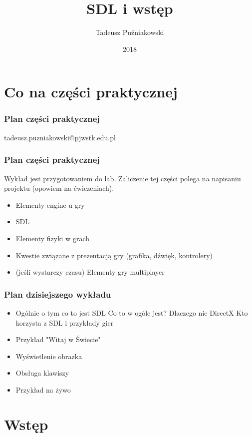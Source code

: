 \documentclass{beamer}
\title[SGD 1]{SDL i wstęp}
\author{Tadeusz Puźniakowski}
\institute{PJATK}
\date{2018}
\begin{document}


\frame{\titlepage}

\section{Co na części praktycznej}

\begin{frame}[fragile]
	\frametitle{Plan części praktycznej}
	tadeusz.puzniakowski@pjwstk.edu.pl
	\EB
\end{frame}

\begin{frame}[fragile]
	\frametitle{Plan części praktycznej}
		Wykład jest przygotowaniem do lab. Zaliczenie tej części polega na napisaniu projektu (opowiem na ćwiczeniach).
		\begin{itemize}
		\item Elementy engine-u gry
		\item SDL
		\item Elementy fizyki w grach
		\item Kwestie związane z prezentacją gry (grafika, dźwięk, kontrolery)
		\item (jeśli wystarczy czasu) Elementy gry multiplayer
		\end{itemize}
	\EB
\end{frame}


\begin{frame}[fragile]
	\frametitle{Plan dzisiejszego wykładu}
		\begin{itemize}
		\item Ogólnie o tym co to jest SDL
		\BI
		   \I Co to w ogóle jest?
		   \I Dlaczego nie DirectX
		   \I Kto korzysta z SDL i przykłady gier
		\EI
		\item Przykład "Witaj w Świecie"
		\item Wyświetlenie obrazka
		\item Obsługa klawiszy
		\item Przykład na żywo
		\end{itemize}
	\EB
\end{frame}
	
\section{Wstęp}
\end{document}
